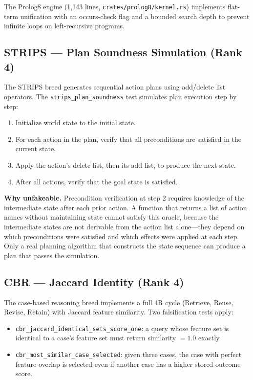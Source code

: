The Prolog8 engine (1,143 lines, \texttt{crates/prolog8/kernel.rs}) implements flat-term
unification with an occurs-check flag and a bounded search depth to prevent infinite loops on
left-recursive programs.

\subsection{STRIPS --- Plan Soundness Simulation (Rank 4)}
\label{subsec:strips-oracle}

The STRIPS breed generates sequential action plans using add/delete list operators. The
\texttt{strips\_plan\_soundness} test simulates plan execution step by step:

\begin{enumerate}
  \item Initialize world state to the initial state.
  \item For each action in the plan, verify that all preconditions are satisfied in the current
    state.
  \item Apply the action's delete list, then its add list, to produce the next state.
  \item After all actions, verify that the goal state is satisfied.
\end{enumerate}

\textbf{Why unfakeable.} Precondition verification at step 2 requires knowledge of the
intermediate state after each prior action. A function that returns a list of action names
without maintaining state cannot satisfy this oracle, because the intermediate states are not
derivable from the action list alone---they depend on which preconditions were satisfied and
which effects were applied at each step. Only a real planning algorithm that constructs the
state sequence can produce a plan that passes the simulation.

\subsection{CBR --- Jaccard Identity (Rank 4)}
\label{subsec:cbr-oracle}

The case-based reasoning breed implements a full 4R cycle (Retrieve, Reuse, Revise, Retain)
with Jaccard feature similarity. Two falsification tests apply:

\begin{itemize}
  \item \texttt{cbr\_jaccard\_identical\_sets\_score\_one}: a query whose feature set is
    identical to a case's feature set must return similarity $= 1.0$ exactly.
  \item \texttt{cbr\_most\_similar\_case\_selected}: given three cases, the case with perfect
    feature overlap is selected even if another case has a higher stored outcome score.
\end{itemize}

